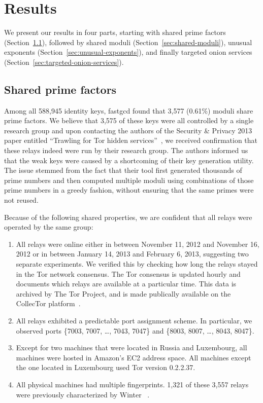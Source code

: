 \section{Results}
\label{sec:results}
We present our results in four parts, starting with shared prime factors
(Section~\ref{sec:shared-primes}), followed by shared moduli
(Section~\ref{sec:shared-moduli}), unusual exponents 
(Section~\ref{sec:unusual-exponents}), and finally targeted onion services
(Section~\ref{sec:targeted-onion-services}).

\subsection{Shared prime factors}
\label{sec:shared-primes}
Among all 588,945 identity keys, fastgcd found that 3,577 (0.61\%) 
moduli share prime factors.  We believe that 3,575 of these keys were all
controlled by a single research group and upon contacting the authors of the
Security \& Privacy 2013 paper entitled ``Trawling for Tor hidden
services''~\cite{Biryukov2013a}, we received confirmation that these relays
indeed were run by their research group.  The authors informed us that the weak
keys were caused by a shortcoming of their key generation utility. The issue
stemmed from the fact that their tool first generated thousands of prime numbers
and then computed multiple moduli using combinations of those prime numbers in a
greedy fashion, without ensuring that the same primes were not reused.

Because of the following shared properties, we are confident that all relays
were operated by the same group:

\begin{enumerate}
	\item All relays were online either in between November 11, 2012 and
		November 16, 2012 or in between January 14, 2013 and February 6, 2013,
		suggesting two separate experiments. We verified this by checking how
		long the relays stayed in the Tor network consensus. The Tor consensus
		is updated hourly and documents which relays are available at a
		particular time. This data is archived by The Tor Project, and is made
		publically available on the CollecTor platform~\cite{collector}.

	\item All relays exhibited a predictable port assignment scheme.  In
		particular, we observed ports \{7003, 7007, \dots, 7043, 7047\} and
		\{8003, 8007, \dots, 8043, 8047\}.

	\item Except for two machines that were located in Russia and Luxembourg,
		all machines were hosted in Amazon's EC2 address space.  All machines
		except the one located in Luxembourg used Tor version 0.2.2.37.

	\item All physical machines had multiple fingerprints.  1,321 of these 3,557
		relays were previously characterized by Winter
		\ea~\cite[\S~5.1]{Winter2016a}.
\end{enumerate}

